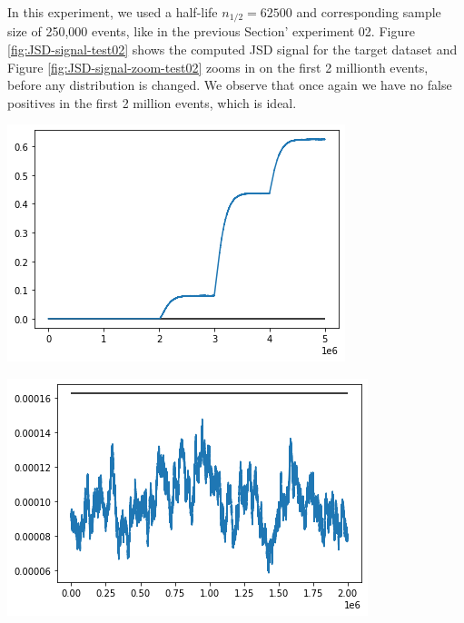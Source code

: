 In this experiment, we used a half-life $n_{1/2}=62500$ and corresponding sample size of 250,000 events, like in the previous Section' experiment 02. Figure \ref{fig:JSD-signal-test02} shows the computed JSD signal for the target dataset and Figure \ref{fig:JSD-signal-zoom-test02} zooms in on the first 2 millionth events, before any distribution is changed. We observe that once again we have no false positives in the first 2 million events, which is ideal. 
\begin{center}
\begin{minipage}{.5\textwidth}
  \centering
  \includegraphics[width=1\linewidth]{figures/stream-analysis-viz-test02.png}
  \label{fig:JSD-signal-test02}
\end{minipage}%
\begin{minipage}{.5\textwidth}
  \centering
  \includegraphics[width=1\linewidth]{figures/stream-analysis-viz-zoom-test02.png}
  \label{fig:JSD-signal-zoom-test02}
\end{minipage}
\end{center}
